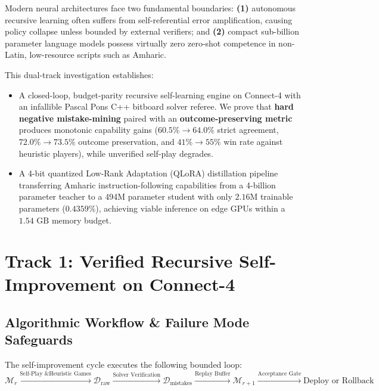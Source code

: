 \documentclass[11pt,a4paper]{article}
\begin{document}
Modern neural architectures face two fundamental boundaries: \textbf{(1)} autonomous recursive learning often suffers from self-referential error amplification, causing policy collapse unless bounded by external verifiers; and \textbf{(2)} compact sub-billion parameter language models possess virtually zero zero-shot competence in non-Latin, low-resource scripts such as Amharic.

This dual-track investigation establishes:
\begin{itemize}[leftmargin=1.5cm]
    \item[\textbf{Track 1:}] A closed-loop, budget-parity recursive self-learning engine on Connect-4 with an infallible Pascal Pons C++ bitboard solver referee. We prove that \textbf{hard negative mistake-mining} paired with an \textbf{outcome-preserving metric} produces monotonic capability gains ($60.5\% \to 64.0\%$ strict agreement, $72.0\% \to 73.5\%$ outcome preservation, and $41\% \to 55\%$ win rate against heuristic players), while unverified self-play degrades.
    \item[\textbf{Track 2:}] A 4-bit quantized Low-Rank Adaptation (QLoRA) distillation pipeline transferring Amharic instruction-following capabilities from a 4-billion parameter teacher to a 494M parameter student with only $2.16\text{M}$ trainable parameters ($0.4359\%$), achieving viable inference on edge GPUs within a $1.54\text{ GB}$ memory budget.
\end{itemize}

\section{Track 1: Verified Recursive Self-Improvement on Connect-4}

\subsection{Algorithmic Workflow \& Failure Mode Safeguards}

The self-improvement cycle executes the following bounded loop:
\[
    \mathcal{M}_r \xrightarrow{\text{Self-Play \& Heuristic Games}} \mathcal{D}_\text{raw} \xrightarrow{\text{Solver Verification}} \mathcal{D}_\text{mistakes} \xrightarrow{\text{Replay Buffer}} \mathcal{M}_{r+1} \xrightarrow{\text{Acceptance Gate}} \text{Deploy or Rollback}
\]
\end{document}
